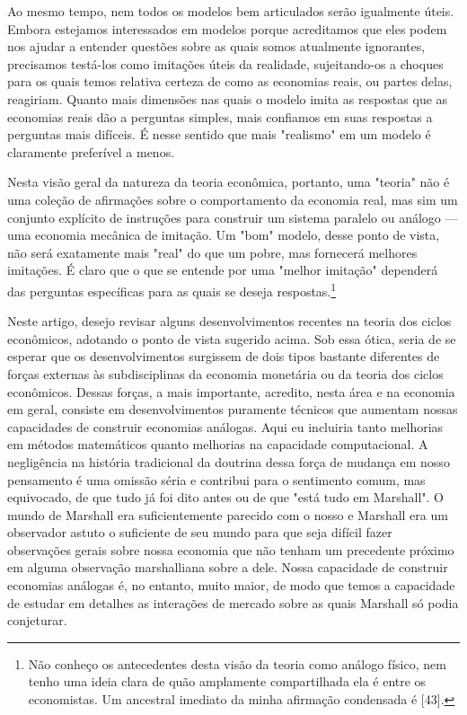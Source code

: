 \documentclass[12pt]{article}
\begin{document}
Ao mesmo tempo, nem todos os modelos bem articulados serão igualmente úteis. Embora estejamos interessados em modelos porque acreditamos que eles podem nos ajudar a entender questões sobre as quais somos atualmente ignorantes, precisamos testá-los como imitações úteis da realidade, sujeitando-os a choques para os quais temos relativa certeza de como as economias reais, ou partes delas, reagiriam. Quanto mais dimensões nas quais o modelo imita as respostas que as economias reais dão a perguntas simples, mais confiamos em suas respostas a perguntas mais difíceis. É nesse sentido que mais "realismo" em um modelo é claramente preferível a menos.

Nesta visão geral da natureza da teoria econômica, portanto, uma "teoria" não é uma coleção de afirmações sobre o comportamento da economia real, mas sim um conjunto explícito de instruções para construir um sistema paralelo ou análogo — uma economia mecânica de imitação. Um "bom" modelo, desse ponto de vista, não será exatamente mais "real" do que um pobre, mas fornecerá melhores imitações. É claro que o que se entende por uma "melhor imitação" dependerá das perguntas específicas para as quais se deseja respostas.\footnote{Não conheço os antecedentes desta visão da teoria como análogo físico, nem tenho uma ideia clara de quão amplamente compartilhada ela é entre os economistas. Um ancestral imediato da minha afirmação condensada é [43].}

Neste artigo, desejo revisar alguns desenvolvimentos recentes na teoria dos ciclos econômicos, adotando o ponto de vista sugerido acima. Sob essa ótica, seria de se esperar que os desenvolvimentos surgissem de dois tipos bastante diferentes de forças externas às subdisciplinas da economia monetária ou da teoria dos ciclos econômicos. Dessas forças, a mais importante, acredito, nesta área e na economia em geral, consiste em desenvolvimentos puramente técnicos que aumentam nossas capacidades de construir economias análogas. Aqui eu incluiria tanto melhorias em métodos matemáticos quanto melhorias na capacidade computacional. A negligência na história tradicional da doutrina dessa força de mudança em nosso pensamento é uma omissão séria e contribui para o sentimento comum, mas equivocado, de que tudo já foi dito antes ou de que "está tudo em Marshall". O mundo de Marshall era suficientemente parecido com o nosso e Marshall era um observador astuto o suficiente de seu mundo para que seja difícil fazer observações gerais sobre nossa economia que não tenham um precedente próximo em alguma observação marshalliana sobre a dele. Nossa capacidade de construir economias análogas é, no entanto, muito maior, de modo que temos a capacidade de estudar em detalhes as interações de mercado sobre as quais Marshall só podia conjeturar.
\end{document}
